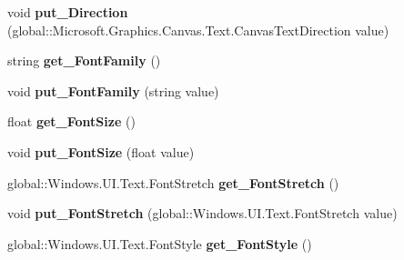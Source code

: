 \begin{DoxyCompactItemize}
void {\bfseries put\+\_\+\+Direction} (global\+::\+Microsoft.\+Graphics.\+Canvas.\+Text.\+Canvas\+Text\+Direction value)
\item 
\mbox{\label{class_microsoft_1_1_graphics_1_1_canvas_1_1_text_1_1_canvas_text_format_a49be7f6687260bafd4e46d160d645c7c}} 
string {\bfseries get\+\_\+\+Font\+Family} ()
\item 
\mbox{\label{class_microsoft_1_1_graphics_1_1_canvas_1_1_text_1_1_canvas_text_format_a7b755c0c506c4ca08e5019ddb932ce37}} 
void {\bfseries put\+\_\+\+Font\+Family} (string value)
\item 
\mbox{\label{class_microsoft_1_1_graphics_1_1_canvas_1_1_text_1_1_canvas_text_format_a373a244b91f0a4a9b07a9757f2abd097}} 
float {\bfseries get\+\_\+\+Font\+Size} ()
\item 
\mbox{\label{class_microsoft_1_1_graphics_1_1_canvas_1_1_text_1_1_canvas_text_format_a218056f08c9d5a288afaaa910a6dcf20}} 
void {\bfseries put\+\_\+\+Font\+Size} (float value)
\item 
\mbox{\label{class_microsoft_1_1_graphics_1_1_canvas_1_1_text_1_1_canvas_text_format_a8fa0c462a565f04478992f537b8bbeef}} 
global\+::\+Windows.\+U\+I.\+Text.\+Font\+Stretch {\bfseries get\+\_\+\+Font\+Stretch} ()
\item 
\mbox{\label{class_microsoft_1_1_graphics_1_1_canvas_1_1_text_1_1_canvas_text_format_aa85c44efbe5ca7507a1097874442af9f}} 
void {\bfseries put\+\_\+\+Font\+Stretch} (global\+::\+Windows.\+U\+I.\+Text.\+Font\+Stretch value)
\item 
\mbox{\label{class_microsoft_1_1_graphics_1_1_canvas_1_1_text_1_1_canvas_text_format_a5fab02754b096992ec1e1c2dc34b5ef1}} 
global\+::\+Windows.\+U\+I.\+Text.\+Font\+Style {\bfseries get\+\_\+\+Font\+Style} ()

\end{DoxyCompactItemize}
